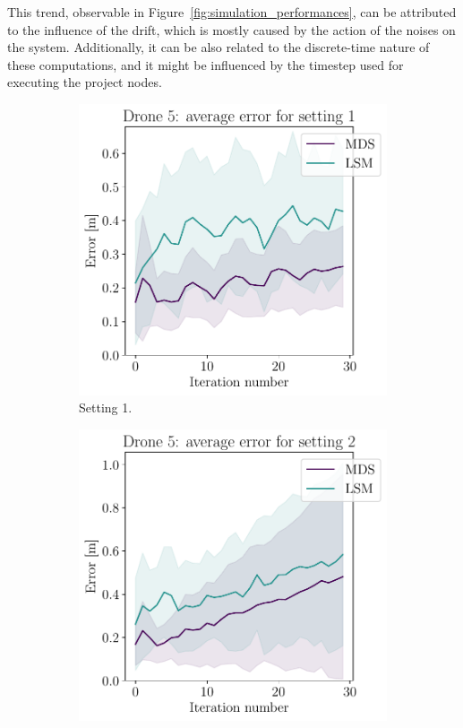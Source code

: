 This trend, observable in Figure~\ref{fig:simulation_performances}, can be attributed to the influence of the drift, which is mostly caused by the action of the noises on the system. Additionally, it can be also related to the discrete-time nature of these computations, and it might be influenced by the timestep used for executing the project nodes.

\begin{figure}[!ht]
     \centering
     \begin{subfigure}[b]{0.28\textwidth}
         \centering
         \includegraphics[width=\textwidth]{figures/drone5_setting1.pdf}
         \caption{Setting 1.}
         \label{fig:setting1_drone5}
     \end{subfigure}
     \hfill
     \begin{subfigure}[b]{0.28\textwidth}
         \centering
         \includegraphics[width=\textwidth]{figures/drone5_setting2.pdf}

\end{subfigure}
\end{figure}
